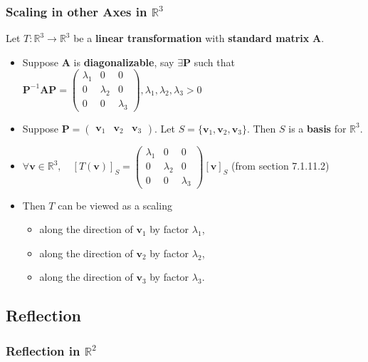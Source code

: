 \documentclass[../ma2001_notes.tex]{subfiles}
\begin{document}
\subsubsection{Scaling in other Axes in $\mathbb{R}^3$}
Let \(T:\mathbb{R}^3\to\mathbb{R}^3\) be a \textbf{linear transformation} with \textbf{standard matrix} \(\bm{A}\).
\begin{itemize}
	\item Suppose \(\bm{A}\) is \textbf{diagonalizable}, say \(\exists\bm{P}\) such that \(\bm{P}^{-1}\bm{AP}=\begin{pmatrix}
	\lambda_1 & 0 & 0 \\
	0 & \lambda_2 & 0 \\
	0 & 0 & \lambda_3
\end{pmatrix},\lambda_1,\lambda_2,\lambda_3>0\)
	\item Suppose \(\bm{P}=\begin{pmatrix}
		\bm{v}_1 & \bm{v}_2 & \bm{v}_3
	\end{pmatrix}\). Let \(S=\{\bm{v}_1,\bm{v}_2,\bm{v}_3\}\). Then \(S\) is a \textbf{basis} for \(\mathbb{R}^3\).
	\item\(\forall\bm{v}\in\mathbb{R}^3,\quad[T(\bm{v})]_S=\begin{pmatrix}
	\lambda_1 & 0 & 0 \\
	0 & \lambda_2 & 0 \\
	0 & 0 & \lambda_3
\end{pmatrix}[\bm{v}]_S\) (from section 7.1.11.2)
	\item Then \(T\) can be viewed as a scaling
	\begin{itemize}
		\item along the direction of \(\bm{v}_1\) by factor \(\lambda_1\),
		\item along the direction of \(\bm{v}_2\) by factor \(\lambda_2\),
		\item along the direction of \(\bm{v}_3\) by factor \(\lambda_3\).
	\end{itemize}
\end{itemize}

\subsection{Reflection}
\subsubsection{Reflection in $\mathbb{R}^2$}
\end{document}
